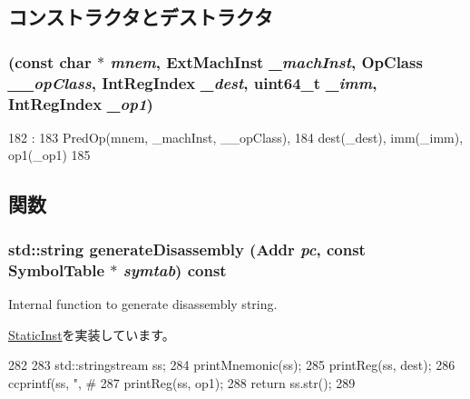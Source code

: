 \subsection{コンストラクタとデストラクタ}
\hypertarget{classRegImmRegOp_a5923528ee8523386ae835460ab10e116}{
\subsubsection[{RegImmRegOp}]{ (const char $\ast$ {\em mnem}, \/  {\bf ExtMachInst} {\em \_\-machInst}, \/  OpClass {\em \_\-\_\-opClass}, \/  {\bf IntRegIndex} {\em \_\-dest}, \/  uint64\_\-t {\em \_\-imm}, \/  {\bf IntRegIndex} {\em \_\-op1})}}
\label{classRegImmRegOp_a5923528ee8523386ae835460ab10e116}



\begin{DoxyCode}
182                                                                     :
183         PredOp(mnem, _machInst, __opClass),
184         dest(_dest), imm(_imm), op1(_op1)
185     {}

\end{DoxyCode}


\subsection{関数}
\hypertarget{classRegImmRegOp_a95d323a22a5f07e14d6b4c9385a91896}{
\subsubsection[{generateDisassembly}]{\setlength{\rightskip}{0pt plus 5cm}std::string generateDisassembly ({\bf Addr} {\em pc}, \/  const SymbolTable $\ast$ {\em symtab}) const}}
\label{classRegImmRegOp_a95d323a22a5f07e14d6b4c9385a91896}
Internal function to generate disassembly string. 

\hyperlink{classStaticInst_ab4a569d2623620c04f8a52bbd91d63b9}{StaticInst}を実装しています。


\begin{DoxyCode}
282 {
283     std::stringstream ss;
284     printMnemonic(ss);
285     printReg(ss, dest);
286     ccprintf(ss, ", #%
287     printReg(ss, op1);
288     return ss.str();
289 }
\end{DoxyCode}


